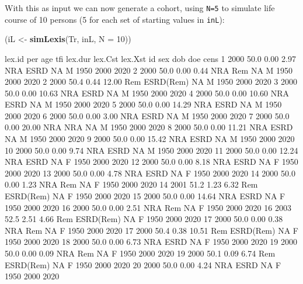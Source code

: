 \documentclass[
]{book}
\newenvironment{Shaded}{\begin{snugshade}}{\end{snugshade}}
\newcommand{\AttributeTok}[1]{\textcolor[rgb]{0.13,0.29,0.53}{#1}}
\newcommand{\DecValTok}[1]{\textcolor[rgb]{0.00,0.00,0.81}{#1}}
\newcommand{\FunctionTok}[1]{\textcolor[rgb]{0.13,0.29,0.53}{\textbf{#1}}}
\newcommand{\NormalTok}[1]{#1}
\newcommand{\OtherTok}[1]{\textcolor[rgb]{0.56,0.35,0.01}{#1}}
\begin{document}
\begin{enumerate}
  With this as input we can now generate a cohort, using \texttt{N=5}
  to simulate life course of 10 persons (5 for each set of starting values
  in \texttt{inL}):

\begin{Shaded}
\begin{Highlighting}[]
\NormalTok{(iL }\OtherTok{\textless{}{-}} \FunctionTok{simLexis}\NormalTok{(Tr, inL, }\AttributeTok{N =} \DecValTok{10}\NormalTok{))}
\end{Highlighting}
\end{Shaded}

\begin{Shaded}
\begin{Highlighting}[]
\NormalTok{ lex.id  per  age  tfi lex.dur lex.Cst   lex.Xst id sex  dob  doe cens}
\NormalTok{      1 2000 50.0 0.00    2.97     NRA      ESRD NA   M 1950 2000 2020}
\NormalTok{      2 2000 50.0 0.00    0.44     NRA       Rem NA   M 1950 2000 2020}
\NormalTok{      2 2000 50.4 0.44   12.00     Rem ESRD(Rem) NA   M 1950 2000 2020}
\NormalTok{      3 2000 50.0 0.00   10.63     NRA      ESRD NA   M 1950 2000 2020}
\NormalTok{      4 2000 50.0 0.00   10.60     NRA      ESRD NA   M 1950 2000 2020}
\NormalTok{      5 2000 50.0 0.00   14.29     NRA      ESRD NA   M 1950 2000 2020}
\NormalTok{      6 2000 50.0 0.00    3.00     NRA      ESRD NA   M 1950 2000 2020}
\NormalTok{      7 2000 50.0 0.00   20.00     NRA       NRA NA   M 1950 2000 2020}
\NormalTok{      8 2000 50.0 0.00   11.21     NRA      ESRD NA   M 1950 2000 2020}
\NormalTok{      9 2000 50.0 0.00   15.42     NRA      ESRD NA   M 1950 2000 2020}
\NormalTok{     10 2000 50.0 0.00    9.74     NRA      ESRD NA   M 1950 2000 2020}
\NormalTok{     11 2000 50.0 0.00   12.24     NRA      ESRD NA   F 1950 2000 2020}
\NormalTok{     12 2000 50.0 0.00    8.18     NRA      ESRD NA   F 1950 2000 2020}
\NormalTok{     13 2000 50.0 0.00    4.78     NRA      ESRD NA   F 1950 2000 2020}
\NormalTok{     14 2000 50.0 0.00    1.23     NRA       Rem NA   F 1950 2000 2020}
\NormalTok{     14 2001 51.2 1.23    6.32     Rem ESRD(Rem) NA   F 1950 2000 2020}
\NormalTok{     15 2000 50.0 0.00   14.64     NRA      ESRD NA   F 1950 2000 2020}
\NormalTok{     16 2000 50.0 0.00    2.51     NRA       Rem NA   F 1950 2000 2020}
\NormalTok{     16 2003 52.5 2.51    4.66     Rem ESRD(Rem) NA   F 1950 2000 2020}
\NormalTok{     17 2000 50.0 0.00    0.38     NRA       Rem NA   F 1950 2000 2020}
\NormalTok{     17 2000 50.4 0.38   10.51     Rem ESRD(Rem) NA   F 1950 2000 2020}
\NormalTok{     18 2000 50.0 0.00    6.73     NRA      ESRD NA   F 1950 2000 2020}
\NormalTok{     19 2000 50.0 0.00    0.09     NRA       Rem NA   F 1950 2000 2020}
\NormalTok{     19 2000 50.1 0.09    6.74     Rem ESRD(Rem) NA   F 1950 2000 2020}
\NormalTok{     20 2000 50.0 0.00    4.24     NRA      ESRD NA   F 1950 2000 2020}
\end{Highlighting}
\end{Shaded}


\end{enumerate}
\end{document}
